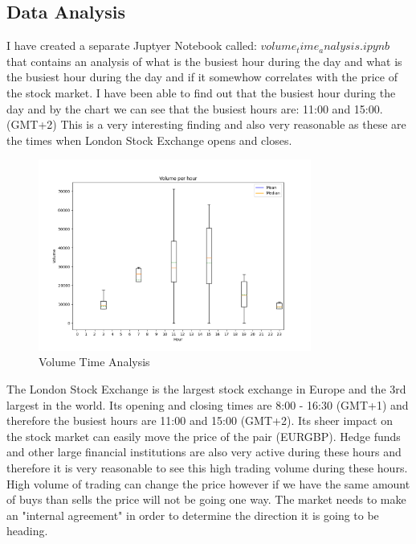 \documentclass{imc-inf}
\begin{document}
		\subsection{Data Analysis}
			
			I have created a separate Juptyer Notebook called: $volume_time_analysis.ipynb$ that contains an analysis of what is the busiest hour during the day and what is the busiest hour during the 
			day and if it somewhow correlates with the price of the stock market. I have been able to find out that the busiest hour during the day and by the 
			chart we can see that the busiest hours are: 11:00 and 15:00. (GMT+2) This is a very interesting finding and also very reasonable as these are the times 
			when London Stock Exchange opens and closes.
			\begin{figure}[h!]
				\centering
				\includegraphics[width=0.8\textwidth]{volumte_time_analysis_histogram.png}
				\caption{Volume Time Analysis}
				\label{fig:volume_time_analysis}
			\end{figure} The London Stock Exchange is the largest stock exchange in Europe and the 3rd largest in the world.
			Its opening and closing times are 8:00 - 16:30 (GMT+1) and therefore the busiest hours are 11:00 and 15:00 (GMT+2). Its sheer impact on the stock market can easily move the 
			price of the pair (EURGBP). Hedge funds and other large financial institutions are also very active during these hours and therefore it is very reasonable to see this high trading volume 
			during these hours. High volume of trading can change the price however if we have the same amount of buys than sells the price will not be going one way. The market needs to make 
			an "internal agreement" in order to determine the direction it is going to be heading.
			
\end{document}
